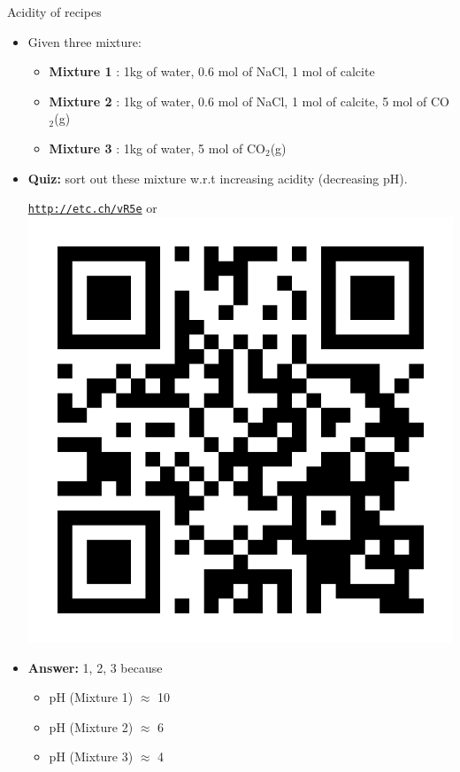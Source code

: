 \begin{frame}{Acidity of recipes}
	\small
	\begin{itemize}
		\item Given three mixture: \\
			\begin{itemize}
				\item  {\bf Mixture 1} :  1kg of water, 0.6 mol of NaCl, 1 mol of calcite \\
				\item  {\bf Mixture 2} :  1kg of water, 0.6 mol of NaCl, 1 mol of calcite, 5 mol of CO$_2$(g)\\
				\item  {\bf Mixture 3} :  1kg of water, 5 mol of CO$_2$(g)\\
			\end{itemize}
		\item \alert{\textbf{Quiz:}} sort out these mixture w.r.t increasing acidity (decreasing pH).\\[5pt]
		\vskip 5pt
		\begin{center}
			\href{http://etc.ch/vR5e}{\textcolor{indigo(dye)}{\tt http://etc.ch/vR5e}} \quad or \quad 
			\includegraphics[height=0.18\columnwidth]{figures/computational-projects/polls.png}
		\end{center}
		\hiddenpause
		\vskip 5pt
		\item {\textbf{Answer:}} 1, 2, 3 because \\
		\begin{itemize}
			\item pH (Mixture 1) $\approx$ 10 \\
			\item pH (Mixture 2) $\approx$ 6 \\
			\item pH (Mixture 3) $\approx$ 4 \\
		\end{itemize}
	\end{itemize}

\end{frame}

